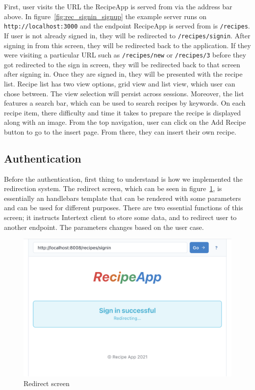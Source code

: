 First, user visits the URL the RecipeApp is served from via the address bar above. In figure~\ref{fig:rec_signin_signup} the example server runs on \texttt{http://localhost:3000} and the endpoint RecipeApp is served from is \texttt{/recipes}. If user is not already signed in, they will be redirected to \texttt{/recipes/signin}. After signing in from this screen, they will be redirected back to the application. If they were visiting a particular URL such as \texttt{/recipes/new} or \texttt{/recipes/3} before they got redirected to the sign in screen, they will be redirected back to that screen after signing in. Once they are signed in, they will be presented with the recipe list. Recipe list has two view options, grid view and list view, which user can chose between. The view selection will persist across sessions. Moreover, the list features a search bar, which can be used to search recipes by keywords. On each recipe item, there difficulty and time it takes to prepare the recipe is displayed along with an image. From the top navigation, user can click on the Add Recipe button to go to the insert page. From there, they can insert their own recipe.

\subsection{Authentication}

Before the authentication, first thing to understand is how we implemented the redirection system. The redirect screen, which can be seen in figure~\ref{fig:rec_redirect}, is essentially an handlebars template that can be rendered with some parameters and can be used for different purposes. There are two essential functions of this screen; it instructs Intertext client to store some data, and to redirect user to another endpoint. The parameters changes based on the user case.

\begin{figure}[htb]
  \centering
  \includegraphics[width=12.4cm]{thesis/paper/images/rec_redirect.png}
  \caption{Redirect screen}%
  \label{fig:rec_redirect}%
\end{figure}

